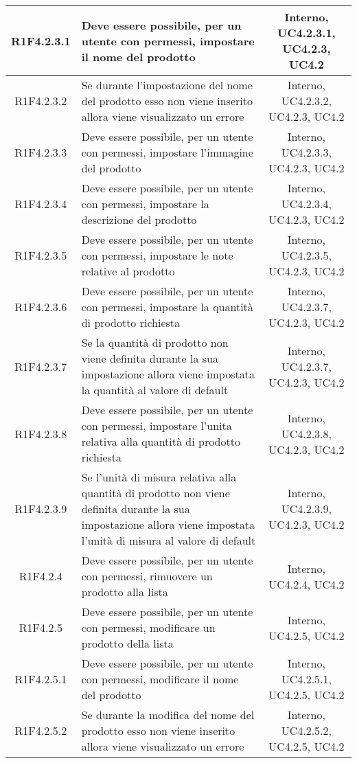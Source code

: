 \begin{longtable}{|c|>{\centering}m{7cm}|c|}
			\hline
			R1F4.2.3.1 & Deve essere possibile, per un utente con permessi, impostare il nome del prodotto & Interno, UC4.2.3.1, UC4.2.3, UC4.2 \\
			\hline
			R1F4.2.3.2 & Se durante l'impostazione del nome del prodotto esso non viene inserito allora viene visualizzato un errore & Interno, UC4.2.3.2, UC4.2.3, UC4.2 \\
			\hline
			R1F4.2.3.3 & Deve essere possibile, per un utente con permessi, impostare l'immagine del prodotto & Interno, UC4.2.3.3, UC4.2.3, UC4.2 \\
			\hline
			R1F4.2.3.4 & Deve essere possibile, per un utente con permessi, impostare la descrizione del prodotto & Interno, UC4.2.3.4, UC4.2.3, UC4.2 \\
			\hline
			R1F4.2.3.5 & Deve essere possibile, per un utente con permessi, impostare le note relative al prodotto & Interno, UC4.2.3.5, UC4.2.3, UC4.2 \\
			\hline
			R1F4.2.3.6 & Deve essere possibile, per un utente con permessi, impostare la quantità di prodotto richiesta & Interno, UC4.2.3.7, UC4.2.3, UC4.2 \\
			\hline
			R1F4.2.3.7 & Se la quantità di prodotto non viene definita durante la sua impostazione allora viene impostata la quantità al valore di default & Interno, UC4.2.3.7, UC4.2.3, UC4.2 \\
			\hline
			R1F4.2.3.8 & Deve essere possibile, per un utente con permessi, impostare l'unita relativa alla quantità di prodotto richiesta & Interno, UC4.2.3.8, UC4.2.3, UC4.2 \\
			\hline
			R1F4.2.3.9 & Se l'unità di misura relativa alla quantità di prodotto non viene definita durante la sua impostazione allora viene impostata l'unità di misura al valore di default & Interno, UC4.2.3.9, UC4.2.3, UC4.2 \\
			\hline
			R1F4.2.4 & Deve essere possibile, per un utente con permessi, rimuovere un prodotto alla lista & Interno, UC4.2.4, UC4.2 \\
			\hline
			R1F4.2.5 & Deve essere possibile, per un utente con permessi, modificare un prodotto della lista & Interno, UC4.2.5, UC4.2 \\
			\hline
			R1F4.2.5.1 & Deve essere possibile, per un utente con permessi, modificare il nome del prodotto & Interno, UC4.2.5.1, UC4.2.5, UC4.2 \\
			\hline
			R1F4.2.5.2 & Se durante la modifica del nome del prodotto esso non viene inserito allora viene visualizzato un errore & Interno, UC4.2.5.2, UC4.2.5, UC4.2 \\

\end{longtable}
